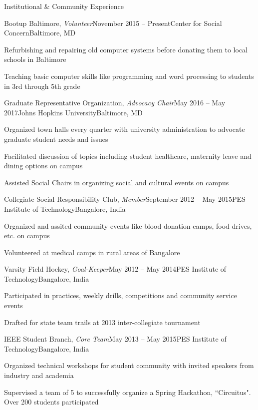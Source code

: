 \documentclass{resume}
\begin{document}
  \begin{rSection}{Institutional \& Community Experience}
\begin{rSubsection}{Bootup Baltimore, \textit{Volunteer}}{November 2015 -- Present}{Center for Social Concern}{Baltimore, MD}
\item Refurbishing and repairing old computer systems before donating them to local schools in Baltimore
\item Teaching basic computer skills like programming and word processing to students in 3rd through 5th grade 
    \end{rSubsection}
          \begin{rSubsection}{Graduate Representative Organization, \textit{Advocacy Chair}}{May 2016 -- May 2017}{Johns Hopkins University}{Baltimore, MD}
\item Organized town halls every quarter with university administration to advocate graduate student needs and issues
\item Facilitated discussion of topics including student healthcare, maternity leave and dining options on campus
\item Assisted Social Chairs in organizing social and cultural events on campus
    \end{rSubsection}

\begin{rSubsection}{Collegiate Social Responsibility Club, \textit{Member}}{September 2012 -- May 2015}{PES Institute of Technology}{Bangalore, India}
\item Organized and assited community events like blood donation camps, food drives, etc. on campus
\item Volunteered at medical camps in rural areas of Bangalore
    \end{rSubsection}

\begin{rSubsection}{Varsity Field Hockey, \textit{Goal-Keeper}}{May 2012 -- May 2014}{PES Institute of Technology}{Bangalore, India}
\item Participated in practices, weekly drills, competitions and community service events
\item Drafted for state team trails at 2013 inter-collegiate tournament 
    \end{rSubsection}

\begin{rSubsection}{IEEE Student Branch, \textit{Core Team}}{May 2013 -- May 2015}{PES Institute of Technology}{Bangalore, India}
\item Organized technical workshops for student community with invited speakers from industry and academia
\item Supervised a team of 5 to successfully organize a Spring Hackathon, ``Circuitus". Over 200 students participated
    \end{rSubsection}
  \end{rSection}   
\end{document}
